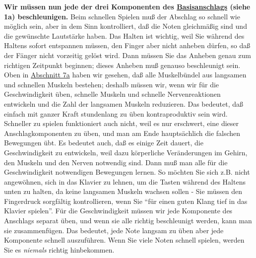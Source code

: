 \textbf{Wir müssen nun jede der drei Komponenten des \hyperref[c1iii1a1]{Basisanschlags} (siehe 1a) beschleunigen.}
Beim schnellen Spielen muß der Abschlag so schnell wie möglich sein, aber in dem Sinn kontrolliert, daß die Noten gleichmäßig sind und die gewünschte Lautstärke haben.
Das Halten ist wichtig, weil Sie während des Haltens sofort entspannen müssen, den Finger aber nicht anheben dürfen, so daß der Fänger nicht vorzeitig gelöst wird.
Dann müssen Sie das Anheben genau zum richtigen Zeitpunkt beginnen; dieses Anheben muß genauso beschleunigt sein.
Oben in \hyperref[c1iii7a]{Abschnitt 7a} haben wir gesehen, daß alle Muskelbündel aus langsamen und schnellen Muskeln bestehen; deshalb müssen wir, wenn wir für die Geschwindigkeit üben, schnelle Muskeln und schnelle Nervenreaktionen entwickeln und die Zahl der langsamen Muskeln reduzieren.
Das bedeutet, daß einfach mit ganzer Kraft stundenlang zu üben kontraproduktiv sein wird.
Schneller zu spielen funktioniert auch nicht, weil es nur erschwert, eine dieser Anschlagkomponenten zu üben, und man am Ende hauptsächlich die falschen Bewegungen übt.
Es bedeutet auch, daß es einige Zeit dauert, die Geschwindigkeit zu entwickeln, weil dazu körperliche Veränderungen im Gehirn, den Muskeln und den Nerven notwendig sind.
Dann muß man alle für die Geschwindigkeit notwendigen Bewegungen lernen.
So möchten Sie sich z.B. nicht angewöhnen, sich in das Klavier zu lehnen, um die Tasten während des Haltens unten zu halten, da keine langsamen Muskeln wachsen sollen - Sie müssen den Fingerdruck sorgfältig kontrollieren, wenn Sie \enquote{für einen guten Klang tief in das Klavier spielen}.
Für die Geschwindigkeit müssen wir jede Komponente des Anschlags separat üben, und wenn sie alle richtig beschleunigt werden, kann man sie zusammenfügen.
Das bedeutet, jede Note langsam zu üben aber jede Komponente schnell auszuführen.
Wenn Sie viele Noten schnell spielen, werden Sie es \textit{niemals} richtig hinbekommen.

